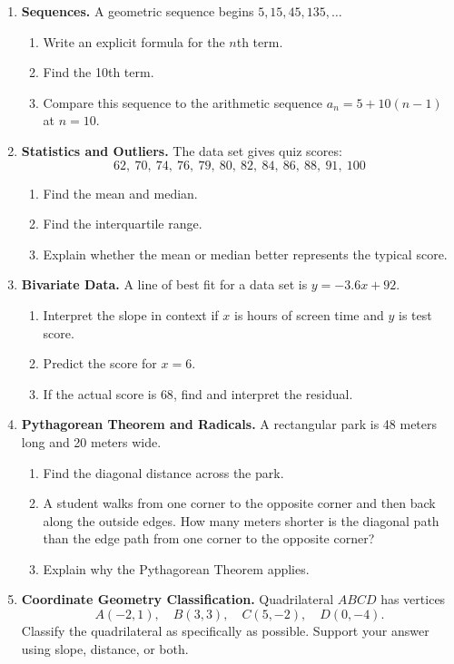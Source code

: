 \documentclass[11pt]{article}
\newcommand{\longwork}{\vspace{4.2cm}}
\begin{document}
\begin{enumerate}
\newpage
\item \textbf{Sequences.} A geometric sequence begins $5,15,45,135,\ldots$
\begin{enumerate}[label=(\alph*)]
\item Write an explicit formula for the $n$th term.
\item Find the 10th term.
\item Compare this sequence to the arithmetic sequence $a_n=5+10(n-1)$ at $n=10$.
\end{enumerate}
\longwork

\item \textbf{Statistics and Outliers.} The data set gives quiz scores:
\[
62,\ 70,\ 74,\ 76,\ 79,\ 80,\ 82,\ 84,\ 86,\ 88,\ 91,\ 100
\]
\begin{enumerate}[label=(\alph*)]
\item Find the mean and median.
\item Find the interquartile range.
\item Explain whether the mean or median better represents the typical score.
\end{enumerate}
\longwork

\newpage
\item \textbf{Bivariate Data.} A line of best fit for a data set is $y=-3.6x+92$.
\begin{enumerate}[label=(\alph*)]
\item Interpret the slope in context if $x$ is hours of screen time and $y$ is test score.
\item Predict the score for $x=6$.
\item If the actual score is $68$, find and interpret the residual.
\end{enumerate}
\longwork

\item \textbf{Pythagorean Theorem and Radicals.} A rectangular park is 48 meters long and 20 meters wide.
\begin{enumerate}[label=(\alph*)]
\item Find the diagonal distance across the park.
\item A student walks from one corner to the opposite corner and then back along the outside edges. How many meters shorter is the diagonal path than the edge path from one corner to the opposite corner?
\item Explain why the Pythagorean Theorem applies.
\end{enumerate}
\longwork

\newpage
\item \textbf{Coordinate Geometry Classification.} Quadrilateral $ABCD$ has vertices
\[
A(-2,1),\quad B(3,3),\quad C(5,-2),\quad D(0,-4).
\]
Classify the quadrilateral as specifically as possible. Support your answer using slope, distance, or both.
\longwork


\end{enumerate}
\end{document}
